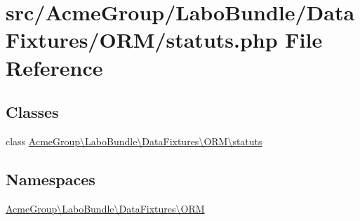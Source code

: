 \hypertarget{statuts_8php}{\section{src/\+Acme\+Group/\+Labo\+Bundle/\+Data\+Fixtures/\+O\+R\+M/statuts.php File Reference}
\label{statuts_8php}
}
\subsection*{Classes}
\begin{DoxyCompactItemize}
\item 
class \hyperlink{class_acme_group_1_1_labo_bundle_1_1_data_fixtures_1_1_o_r_m_1_1statuts}{Acme\+Group\textbackslash{}\+Labo\+Bundle\textbackslash{}\+Data\+Fixtures\textbackslash{}\+O\+R\+M\textbackslash{}statuts}
\end{DoxyCompactItemize}
\subsection*{Namespaces}
\begin{DoxyCompactItemize}
\item 
 \hyperlink{namespace_acme_group_1_1_labo_bundle_1_1_data_fixtures_1_1_o_r_m}{Acme\+Group\textbackslash{}\+Labo\+Bundle\textbackslash{}\+Data\+Fixtures\textbackslash{}\+O\+R\+M}
\end{DoxyCompactItemize}
